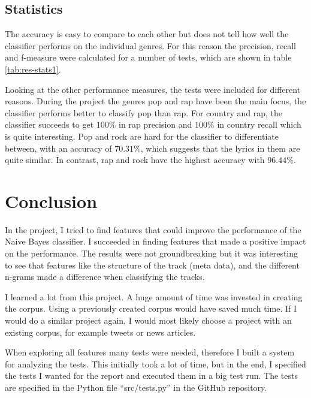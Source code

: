 \documentclass[a4paper, 12pt]{article}
\begin{document}
\subsection{Statistics}
The accuracy is easy to compare to each other but does not tell how well the classifier performs on the individual genres.
For this reason the precision, recall and f-measure were calculated for a number of tests, which are shown in table \ref{tab:res-stats1}.

Looking at the other performance measures, the tests were included for different reasons.
During the project the genres pop and rap have been the main focus, the classifier performs better to classify pop than rap.
For country and rap, the classifier succeeds to get $100\%$ in rap precision and $100\%$ in country recall which is quite interesting.
Pop and rock are hard for the classifier to differentiate between, with an accuracy of $70.31\%$, which suggests that the lyrics in them are quite similar.
In contrast, rap and rock have the highest accuracy with $96.44\% $.

\section{Conclusion}
In the project, I tried to find features that could improve the performance of the Naive Bayes classifier.
I succeeded in finding features that made a positive impact on the performance.
The results were not groundbreaking but it was interesting to see that features like the structure of the track (meta data), and the different n-grams made a difference when classifying the tracks.

I learned a lot from this project.
A huge amount of time was invested in creating the corpus.
Using a previously created corpus would have saved much time.
If I would do a similar project again, I would most likely choose a project with an existing corpus, for example tweets or news articles.

When exploring all features many tests were needed, therefore I built a system for analyzing the tests.
This initially took a lot of time, but in the end, I specified the tests I wanted for the report and executed them in a big test run.
The tests are specified in the Python file ``src/tests.py'' in the GitHub repository.

\pagebreak


\end{document}
